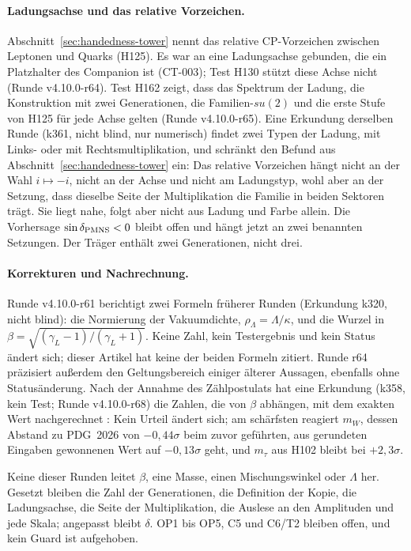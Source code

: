 \paragraph{Ladungsachse und das relative Vorzeichen.}
Abschnitt~\ref{sec:handedness-tower} nennt das relative CP-Vorzeichen zwischen Leptonen und Quarks (H125). Es war an eine Ladungsachse
gebunden, die ein Platzhalter des Companion ist (CT-003); Test H130 stützt diese Achse nicht (Runde v4.10.0-r64). Test H162 zeigt, dass das
Spektrum der Ladung, die Konstruktion mit zwei Generationen, die Familien-\(su(2)\) und die erste Stufe von H125 für jede Achse gelten
(Runde v4.10.0-r65). Eine Erkundung derselben Runde (k361, nicht blind, nur numerisch) findet zwei Typen der Ladung, mit Links- oder mit
Rechtsmultiplikation, und schränkt den Befund aus Abschnitt~\ref{sec:handedness-tower} ein: Das relative Vorzeichen hängt nicht an der Wahl
\(i\mapsto-i\), nicht an der Achse und nicht am Ladungstyp, wohl aber an der Setzung, dass dieselbe Seite der Multiplikation die Familie in
beiden Sektoren trägt. Sie liegt nahe, folgt aber nicht aus Ladung und Farbe allein. Die Vorhersage \(\sin\delta_{\rm PMNS}<0\) bleibt offen
und hängt jetzt an zwei benannten Setzungen. Der Träger enthält zwei Generationen, nicht drei.

\paragraph{Korrekturen und Nachrechnung.}
Runde v4.10.0-r61 berichtigt zwei Formeln früherer Runden (Erkundung k320, nicht blind): die Normierung der Vakuumdichte,
\(\rho_\Lambda=\Lambda/\kappa\), und die Wurzel in \(\beta=\sqrt{(\gamma_L-1)/(\gamma_L+1)}\). Keine Zahl, kein Testergebnis und kein Status
ändert sich; dieser Artikel hat keine der beiden Formeln zitiert. Runde r64 präzisiert außerdem den Geltungsbereich einiger älterer Aussagen,
ebenfalls ohne Statusänderung. Nach der Annahme des Zählpostulats hat eine Erkundung (k358, kein Test; Runde v4.10.0-r68) die Zahlen, die von \(\beta\)
abhängen, mit dem exakten Wert nachgerechnet \cite{recalc}: Kein Urteil ändert sich; am schärfsten reagiert \(m_W\), dessen Abstand zu
PDG~2026 von \(-0{,}44\sigma\) beim zuvor geführten, aus gerundeten Eingaben gewonnenen Wert auf \(-0{,}13\sigma\) geht, und \(m_\tau\) aus
H102 bleibt bei \(+2{,}3\sigma\).

Keine dieser Runden leitet \(\beta\), eine Masse, einen Mischungswinkel oder \(\Lambda\) her. Gesetzt bleiben die Zahl der Generationen,
die Definition der Kopie, die Ladungsachse, die Seite der Multiplikation, die Auslese an den Amplituden und jede Skala; angepasst bleibt
\(\delta\). OP1 bis OP5, C5 und C6/T2 bleiben offen, und kein Guard ist aufgehoben.

